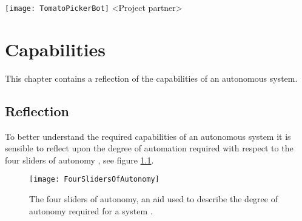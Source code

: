 \documentclass[%
oneside,    %
project,    %
nosummary   %
]{USN-MSc}
\newcommand{\myauthor}{%
223786 Lars Rikard Rådstoga
}
\newcommand{\myparticipants}{
<First participant>\\
<Second participant>\\
<Third participant>\\
<Fourth participant>
}
\begin{document}
\USNtitlepage%
{%
  {\normalsize}
   \texttt{[image: TomatoPickerBot]}}
{<Project partner>}
{%
\lipsum[6-7]
}





\tableofcontents
{}




\chapter{Capabilities}
\label{ch:cap}
This chapter contains a reflection of the capabilities of an autonomous system.
\section{Reflection}
To better understand the required capabilities of an autonomous system it is sensible to reflect upon the degree of automation required with respect to the four sliders of autonomy \cite{murphy2000introduction}, see figure \ref{fig:fourSliders}.

\begin{figure}[!ht]
  \centering
  \texttt{[image: FourSlidersOfAutonomy]}
  \caption{The four sliders of autonomy, an aid used to describe the degree of autonomy required for a system \cite{murphy2000introduction}.}
  \label{fig:fourSliders}
\end{figure}
\end{document}
